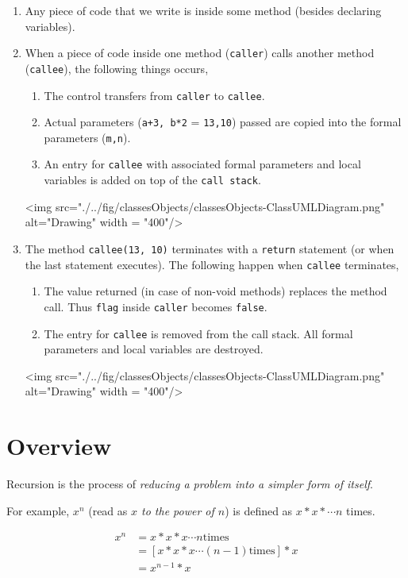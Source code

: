 \begin{enumerate}
  \item Any piece of code that we write is inside some method (besides declaring variables).
  \item When a piece of code inside one method (\texttt{caller}) calls another method (\texttt{callee}), the following things occurs,
  \begin{enumerate}
  \item The control transfers from \texttt{caller} to \texttt{callee}. 
  \item Actual parameters (\texttt{a+3, b*2} = \texttt{13,10}) passed are copied into the formal parameters (\texttt{m,n}). 
  \item An entry for \texttt{callee} with associated formal parameters and local variables is added on top of the \texttt{call stack}.
  \end{enumerate}
  <img src="./../fig/classesObjects/classesObjects-ClassUMLDiagram.png" alt="Drawing" width = "400"/>

  \item The method \texttt{callee(13, 10)} terminates with a \texttt{return} statement (or when the last statement  executes). The following happen when \texttt{callee} terminates,
  \begin{enumerate}
  \item The value returned (in case of non-void methods) replaces the method call. Thus \texttt{flag} inside \texttt{caller} becomes \texttt{false}.
  \item The entry for \texttt{callee} is removed from the call stack. All formal parameters and local variables are destroyed.
  \end{enumerate}
  <img src="./../fig/classesObjects/classesObjects-ClassUMLDiagram.png" alt="Drawing" width = "400"/>
\end{enumerate}

\section{Overview}
Recursion is the process of \emph{reducing a problem into a simpler form of itself}.

For example, $x^n$ (read as \emph{$x$ to the power of $n$}) is defined as $x * x * \cdots n$ times.

\large
\begin{align*}
x^n&=x * x * x \cdots n \text{times}\\
       &=[x * x * x \cdots (n-1) \text{times}] * x\\
       &=x^{n-1} * x
\end{align*} 
\normalsize


